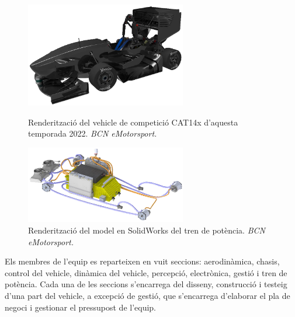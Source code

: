 {    \begin{figure}[!htb]
        \centering
        \begin{minipage}[c]{7cm}
            \centering
            \captionsetup{justification=centering}
            \includegraphics[width=7cm]
                { img/2_formula_student/cat14-x.png }
            \caption[Renderització del CAT14x. \emph{BCN eMotorsport} ]
            { 
                Renderització del vehicle de competició CAT14x d'aquesta
                temporada 2022. \emph{BCN eMotorsport.} 
            }             
        \end{minipage} \hfil
        \begin{minipage}[c]{7cm}
            \centering
            \captionsetup{justification=centering}
            \includegraphics[width=7cm]
                { img/2_formula_student/power.png }
            \caption[Renderització del tren de potència. \emph{BCN eMotorsport} ]
            { 
                Renderització del model en SolidWorks del tren de potència.
                \emph{BCN eMotorsport.}  
            }                
        \end{minipage} \hfil
    \end{figure} 

    Els membres de l'equip es reparteixen en vuit seccions: aerodinàmica,
    chasis, control del vehicle, dinàmica del vehicle, percepció, electrònica,
    gestió i tren de potència. Cada una de les seccions s'encarrega del
    disseny, construcció i testeig d'una part del vehicle, a excepció de
    gestió, que s'encarrega d'elaborar el pla de negoci i gestionar el
    pressupost de l'equip.
}

